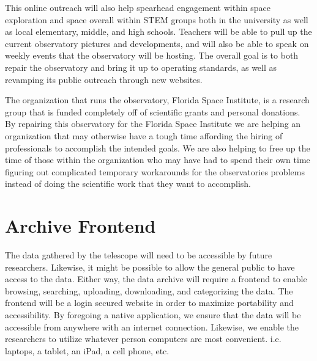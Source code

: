 \documentclass[12pt]{report}
\begin{document}
This online outreach will also help spearhead engagement within space exploration and space overall within STEM groups both in the university as well as local elementary, middle, and high schools. Teachers will be able to pull up the current observatory pictures and developments, and will also be able to speak on weekly events that the observatory will be hosting. The overall goal is to both repair the observatory and bring it up to operating standards, as well as revamping its public outreach through new websites.

The organization that runs the observatory, Florida Space Institute, is a research group that is funded completely off of scientific grants and personal donations. By repairing this observatory for the Florida Space Institute we are helping an organization that may otherwise have a tough time affording the hiring of professionals to accomplish the intended goals. We are also helping to free up the time of those within the organization who may have had to spend their own time figuring out complicated temporary workarounds for the observatories problems instead of doing the scientific work that they want to accomplish.

\section*{Archive Frontend}

The data gathered by the telescope will need to be accessible by future researchers. Likewise, it might be possible to allow the general public to have access to the data. Either way, the data archive will require a frontend to enable browsing, searching, uploading, downloading, and categorizing the data. The frontend will be a login secured website in order to maximize portability and accessibility. By foregoing a native application, we ensure that the data will be accessible from anywhere with an internet connection. Likewise, we enable the researchers to utilize whatever person computers are most convenient. i.e. laptops, a tablet, an iPad, a cell phone, etc.
\end{document}
